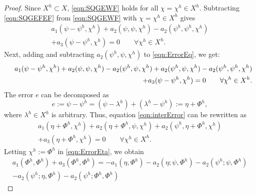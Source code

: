 \begin{proof}
  Since $X^h \subset X$, \eqref{eqn:SQGEWF} holds for all $\chi = \chi^h\in X^h$.
  Subtracting \eqref{eqn:SQGEFEF} from \eqref{eqn:SQGEWF} with $\chi=\chi^h \in
  X^h$ gives
  \begin{equation}
    \begin{split}
      a_1(\psi - \psi^h,\chi^h) + a_2(\psi,\psi,\chi^h) -
      a_2(\psi^h,\psi^h,\chi^h) \\ 
      + a_3(\psi-\psi^h,\chi^h) = 0 \qquad \forall \chi^h \in
    X^h.
  \end{split}
    \label{eqn:ErrorEq}
  \end{equation}
  Next, adding and subtracting $a_2(\psi^h,\psi,\chi^h)$ to \eqref{eqn:ErrorEq}, we get:
  \begin{eqnarray}
      && a_1(\psi - \psi^h,\chi^h) + a_2(\psi,\psi,\chi^h) - a_2(\psi^h,\psi,\chi^h) %
      + a_2(\psi^h,\psi,\chi^h) - a_2(\psi^h,\psi^h,\chi^h) \nonumber \\
      && \hspace*{3.0cm} + a_3(\psi-\psi^h,\chi^h) = 0 \qquad \forall \chi^h \in X^h.
    \label{eqn:interError}
  \end{eqnarray}
  The error $e$ can be decomposed as 
  \begin{equation}
    e:= \psi-\psi^h = (\psi-\lambda^h)+(\lambda^h-\psi^h):= \eta + \Phi^h,
    \label{eqn:ErrorTrick}
  \end{equation}
  where $\lambda^h\in X^h$ is arbitrary. 
  Thus, equation \eqref{eqn:interError} can be
  rewritten as 
  \begin{equation}
    \begin{split}
      a_1(\eta+\Phi^h,\chi^h)+a_2(\eta+\Phi^h,\psi,\chi^h)+a_2(\psi^h,\eta+\Phi^h,\chi^h) \\
      + a_3(\eta+\Phi^h,\chi^h)=0 \qquad \forall \chi^h \in X^h.
    \end{split}
    \label{eqn:ErrorEta}
  \end{equation}
  Letting $\chi^h := \Phi^h$ in \eqref{eqn:ErrorEta}, we obtain 
  \begin{equation}
    \begin{split}
      a_1(\Phi^h,\Phi^h) + a_3(\Phi^h,\Phi^h) = -a_1(\eta,\Phi^h)
      - a_2(\eta;\psi,\Phi^h) - a_2(\psi^h;\psi,\Phi^h) \\
      - a_2(\psi^h;\eta,\Phi^h) - a_2(\psi^h;\Phi^h,\Phi^h)

\end{split}
\end{equation}
\end{proof}
